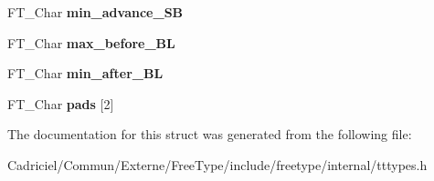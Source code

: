 \begin{DoxyCompactItemize}
\item 
\hypertarget{struct_t_t___s_bit___line_metrics_rec___ad4f4578a99ce4537bd454bf47a60074c}{F\-T\-\_\-\-Char {\bfseries min\-\_\-advance\-\_\-\-S\-B}}\label{struct_t_t___s_bit___line_metrics_rec___ad4f4578a99ce4537bd454bf47a60074c}

\item 
\hypertarget{struct_t_t___s_bit___line_metrics_rec___a63599b9adfc64d1927b6a8b46d9ce08d}{F\-T\-\_\-\-Char {\bfseries max\-\_\-before\-\_\-\-B\-L}}\label{struct_t_t___s_bit___line_metrics_rec___a63599b9adfc64d1927b6a8b46d9ce08d}

\item 
\hypertarget{struct_t_t___s_bit___line_metrics_rec___a553dfe17d98fd138430545f4f77195c5}{F\-T\-\_\-\-Char {\bfseries min\-\_\-after\-\_\-\-B\-L}}\label{struct_t_t___s_bit___line_metrics_rec___a553dfe17d98fd138430545f4f77195c5}

\item 
\hypertarget{struct_t_t___s_bit___line_metrics_rec___a9f98e5de39f252b6ebfb3e94120d1dbc}{F\-T\-\_\-\-Char {\bfseries pads} \mbox{[}2\mbox{]}}\label{struct_t_t___s_bit___line_metrics_rec___a9f98e5de39f252b6ebfb3e94120d1dbc}

\end{DoxyCompactItemize}


The documentation for this struct was generated from the following file\-:\begin{DoxyCompactItemize}
\item 
Cadriciel/\-Commun/\-Externe/\-Free\-Type/include/freetype/internal/tttypes.\-h\end{DoxyCompactItemize}
